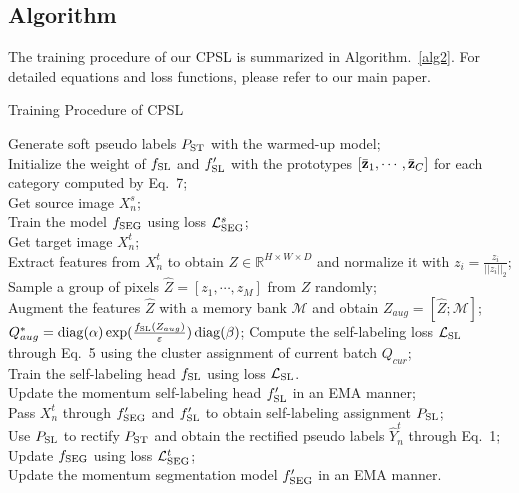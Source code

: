 \documentclass[10pt,twocolumn,letterpaper]{article}
\DeclareMathOperator*{\diag}{diag}
\begin{document}
\subsection{Algorithm}
The training procedure of our CPSL is summarized in Algorithm.~\ref{alg2}. For detailed equations and loss functions, please refer to our main paper.
\begin{algorithm}[!h]
	\caption{Training Procedure of CPSL}\label{alg2}
	{Generate soft pseudo labels $P_{\rm ST}$ with the warmed-up model;}\\
	{Initialize the weight of $f_{\rm SL}$ and $f'_{\rm SL}$ with the prototypes $[\bar{\bf{z}}_1,\cdots,\bar{\bf{z}}_C]$ for each category computed by Eq.~7;}\\
	{	
	    {   Get source image $X^s_n$;\\
	        Train the model $f_{\rm SEG}$ using loss $\mathcal{L}^s_{\rm SEG}$;\\
	        \vspace{1.5em}
	        Get target image $X^t_n$;\\
	        Extract features from $X^t_n$ to obtain ${Z}\in \mathbb{R}^{H\times W\times D}$ and normalize it with ${{ z}_i}=\frac{{ z}_i}{||{ z}_i||_2}$;\\
	        Sample a group of pixels $\hat{Z}=[{ z}_1,\cdots,{ z}_M]$ from $Z$ randomly;\\
	        Augment the features $\hat{Z}$ with a memory bank $\mathcal{M}$ and obtain $Z_{aug}=[\hat{Z};\mathcal{M}]$;\\
	            {$Q^*_{aug} = {\diag}(\alpha)\exp(\frac{f_{\rm SL}(Z_{aug})}{\varepsilon})\diag(\beta)$;
	            }
	       Compute the self-labeling loss $\mathcal{L}_{\rm SL}$ through Eq.~5 using the cluster assignment of current batch $Q_{cur}$;\\
	       Train the self-labeling head $f_{\rm SL}$ using loss $\mathcal{L}_{\rm SL}$. \\
	       \vspace{1.5em}
	       Update the momentum self-labeling head $f'_{\rm SL}$ in an EMA manner;\\
	       Pass $X^t_n$ through $f'_{\rm SEG}$ and $f'_{\rm SL}$ to obtain self-labeling assignment $P_{\rm SL}$;\\
	       Use $P_{\rm SL}$ to rectify $P_{\rm ST}$ and obtain the rectified pseudo labels $\hat{Y}_n^t$ through Eq.~1;\\
	       Update $f_{\rm SEG}$ using loss $\mathcal{L}^t_{\rm SEG}$;\\
	       Update the momentum segmentation model $f'_{\rm SEG}$ in an EMA manner. 
	    }
	}
\end{algorithm}
\end{document}
